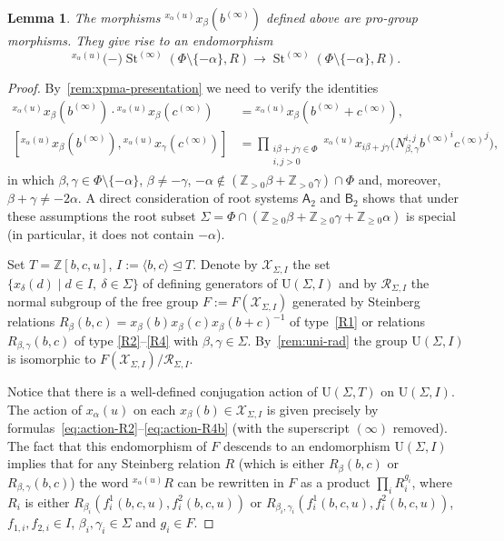 \documentclass[oneside, 11pt]{amsart}
\numberwithin{equation}{section}
\newtheorem{lemma}{Lemma} \numberwithin{lemma}{section}
\theoremstyle{definition}
\theoremstyle{remark}
\DeclareMathOperator\St{St}
\newcommand{\ZZ}{\mathbb{Z}}
\newcommand{\up}[2]{{^{#1}\!{#2}}}
\newcommand{\rA}{\mathsf{A}}
\newcommand{\rB}{\mathsf{B}}
\begin{document}
\begin{lemma}
 The morphisms $\up{x_\alpha(u)}x_\beta(b^{(\infty)})$ defined above are pro-group morphisms. They give rise to an endomorphism 
 \[\up{x_\alpha(u)}(-) \St^{(\infty)}(\Phi\setminus\{-\alpha\}, R) \to \St^{(\infty)}(\Phi\setminus\{-\alpha\}, R).\]
\end{lemma}
\begin{proof}
 By~\cref{rem:xpma-presentation} we need to verify the identities
 \begin{align}
 \up{x_\alpha(u)} x_\beta(b^{(\infty)}) \cdot \up{x_\alpha(u)} x_\beta(c^{(\infty)}) & = \up{x_\alpha(u)} x_\beta(b^{(\infty)} + c^{(\infty)}), \label{eq:additivity} \\
 [\up{x_\alpha(u)}{x_\beta(b^{(\infty)})}, \up{x_\alpha(u)}{x_\gamma(c^{(\infty)})}] & = \prod_{\substack{i\beta + j\gamma \in \Phi\\ i, j > 0}} \up{x_\alpha(u)}{x_{i\beta + j\gamma}\bigl(N_{\beta, \gamma}^{i, j} {b^{(\infty)}}^i {c^{(\infty)}}^j \bigr)}, \label{eq:main-equation} \end{align}
 in which \(\beta, \gamma \in \Phi \setminus \{- \alpha\}\), $\beta \neq -\gamma$, $-\alpha\not\in(\ZZ_{>0}\beta + \ZZ_{>0}\gamma) \cap \Phi$ and, moreover,
  $\beta+\gamma\neq -2\alpha$. A direct consideration of root systems $\rA_2$ and $\rB_2$ shows that under these assumptions the root subset $\Sigma = \Phi\cap (\ZZ_{\geq 0}\beta + \ZZ_{\geq 0}\gamma + \ZZ_{\geq 0}\alpha)$ is special (in particular, it does not contain $-\alpha$).
  
 Set $T = \ZZ[b,c,u]$, $I := \langle b, c \rangle \trianglelefteq T$. Denote by $\mathcal{X}_{\Sigma, I}$ the set $\{ x_\delta(d) \mid d\in I,\ \delta\in\Sigma \}$ of defining generators of $\mathrm{U}(\Sigma, I)$ and by $\mathcal{R}_{\Sigma, I}$ the normal subgroup of the free group $F:=F(\mathcal{X}_{\Sigma, I})$ generated by Steinberg relations $R_\beta(b, c) = x_\beta(b)x_\beta(c)x_\beta(b + c)^{-1}$ of type~\eqref{R1} or relations $R_{\beta,\gamma}(b,c)$ of type \eqref{R2}--\eqref{R4} with $\beta,\gamma \in \Sigma$. By~\cref{rem:uni-rad} the group $\mathrm{U}(\Sigma, I)$ is isomorphic to $F(\mathcal{X}_{\Sigma, I})/\mathcal{R}_{\Sigma, I}$.
 
 Notice that there is a well-defined conjugation action of $\mathrm{U}(\Sigma, T)$ on $\mathrm{U}(\Sigma, I)$. The action of $x_\alpha(u)$ on each $x_\beta(b) \in \mathcal{X}_{\Sigma, I}$ is given precisely by formulas~\eqref{eq:action-R2}--\eqref{eq:action-R4b} (with the superscript $(\infty)$ removed). The fact that this endomorphism of $F$ descends to an endomorphism $\mathrm{U}(\Sigma, I)$ implies that for any Steinberg relation $R$ (which is either $R_\beta(b,c)$ or $R_{\beta,\gamma}(b,c)$) the word $\up{x_\alpha(u)}R$ can be rewritten in $F$ as a product $\prod_i R_i^{g_i}$, where $R_i$ is either $R_{\beta_i}(f_{i}^1(b,c,u), f_{i}^2(b,c,u))$ or $R_{\beta_i,\gamma_i}(f^{1}_i(b,c,u), f^{2}_i(b,c,u))$, $f_{1,i}, f_{2,i} \in I$, $\beta_i, \gamma_i \in \Sigma$ and $g_i \in F$.
 

\end{proof}
\end{document}
